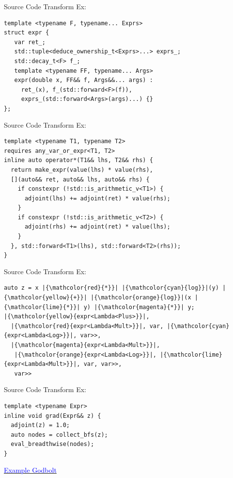 \documentclass[dvipsnames]{beamer}
\makeatletter
\def\mathcolor#1#{\@mathcolor{#1}}
\def\@mathcolor#1#2#3{%
  \protect\leavevmode
  \begingroup
    \color#1{#2}#3%
  \endgroup
}
\makeatother
\begin{document}
\begin{frame}[fragile]{Source Code Transform Ex:}
\begin{verbatim}
template <typename F, typename... Exprs>
struct expr {
   var ret_;
   std::tuple<deduce_ownership_t<Exprs>...> exprs_;
   std::decay_t<F> f_;
   template <typename FF, typename... Args>
   expr(double x, FF&& f, Args&&... args) :
     ret_(x), f_(std::forward<F>(f)),
     exprs_(std::forward<Args>(args)...) {}
};
\end{verbatim}
\end{frame}

\begin{frame}[fragile]{Source Code Transform Ex:}
\begin{verbatim}
template <typename T1, typename T2>
requires any_var_or_expr<T1, T2>
inline auto operator*(T1&& lhs, T2&& rhs) {
  return make_expr(value(lhs) * value(rhs),
  [](auto&& ret, auto&& lhs, auto&& rhs) {
    if constexpr (!std::is_arithmetic_v<T1>) {
      adjoint(lhs) += adjoint(ret) * value(rhs);
    }
    if constexpr (!std::is_arithmetic_v<T2>) {
      adjoint(rhs) += adjoint(ret) * value(lhs);
    }
  }, std::forward<T1>(lhs), std::forward<T2>(rhs));
}
\end{verbatim}
\end{frame}

\begin{frame}[fragile]{Source Code Transform Ex:}
\begin{verbatim}
auto z = x |{\mathcolor{red}{*}}| |{\mathcolor{cyan}{log}}|(y) |{\mathcolor{yellow}{+}}| |{\mathcolor{orange}{log}}|(x |{\mathcolor{lime}{*}}| y) |{\mathcolor{magenta}{*}}| y;
|{\mathcolor{yellow}{expr<Lambda<Plus>}}|,
  |{\mathcolor{red}{expr<Lambda<Mult>}}|, var, |{\mathcolor{cyan}{expr<Lambda<Log>}}|, var>>,
  |{\mathcolor{magenta}{expr<Lambda<Mult>}}|,
   |{\mathcolor{orange}{expr<Lambda<Log>}}|, |{\mathcolor{lime}{expr<Lambda<Mult>}}|, var, var>>,
   var>>
\end{verbatim}
\end{frame}

\begin{frame}[fragile]{Source Code Transform Ex:}
\begin{verbatim}
template <typename Expr>
inline void grad(Expr&& z) {
  adjoint(z) = 1.0;
  auto nodes = collect_bfs(z);
  eval_breadthwise(nodes);
}
\end{verbatim}
\centerline{\href{https://godbolt.org/z/veexMT5vz}{\textcolor{blue}{Example Godbolt}}}

\end{frame}

\end{document}
